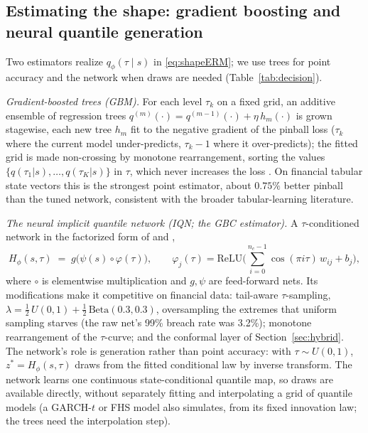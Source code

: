 \documentclass[11pt]{article}
\theoremstyle{remark}
\begin{document}
\subsection{Estimating the shape: gradient boosting and neural quantile
generation}\label{sec:gbcmethod}

Two estimators realize $q_\phi(\tau\mid s)$ in \eqref{eq:shapeERM}; we
use trees for point accuracy and the network when draws are needed
(Table~\ref{tab:decision}).

\emph{Gradient-boosted trees (GBM).} For each level $\tau_k$ on a fixed
grid, an additive ensemble of regression trees
$q^{(m)}(\cdot) = q^{(m-1)}(\cdot) + \eta\, h_m(\cdot)$ is grown
stagewise, each new tree $h_m$ fit to the negative gradient of the
pinball loss ($\tau_k$ where the current model under-predicts,
$\tau_k - 1$ where it over-predicts); the fitted grid is made non-crossing by monotone rearrangement, sorting the values
$\{q(\tau_1|s),\dots,q(\tau_K|s)\}$ in $\tau$, which never increases the
loss \citep{cherno2010rearr}. On financial tabular state
vectors this is the strongest point estimator, about $0.75\%$ better pinball than the tuned network, consistent with the broader
tabular-learning literature.

\emph{The neural implicit quantile network (IQN; the GBC estimator).} A
$\tau$-conditioned network
in the factorized form of \citet{dabney2018iqn} and
\citet{polson2023gbc},
\begin{equation}
H_\phi(s,\tau) \;=\; g\big(\psi(s)\circ\varphi(\tau)\big),
\qquad
\varphi_j(\tau) = \mathrm{ReLU}\Big(\textstyle\sum_{i=0}^{n_c-1}
\cos(\pi i \tau)\, w_{ij} + b_j\Big),
\label{eq:iqn}
\end{equation}
where $\circ$ is elementwise multiplication and $g,\psi$ are
feed-forward nets. Its modifications make it competitive on financial
data: tail-aware
$\tau$-sampling, $\lambda = \tfrac12\,U(0,1) +
\tfrac12\,\mathrm{Beta}(0.3,0.3)$, oversampling the extremes that
uniform sampling starves (the raw net's 99\% breach rate was 3.2\%);
monotone rearrangement of the $\tau$-curve; and the conformal layer of
Section~\ref{sec:hybrid}. The network's role is generation rather than
point accuracy: with $\tau\sim U(0,1)$,
$z^{*} = H_\phi(s,\tau)$ draws from the fitted conditional law by
inverse transform. The network learns one continuous
state-conditional quantile map, so draws are available directly,
without separately fitting and interpolating a grid of quantile
models (a GARCH-$t$ or FHS model also simulates, from its fixed
innovation law; the trees need the interpolation step).
\end{document}
